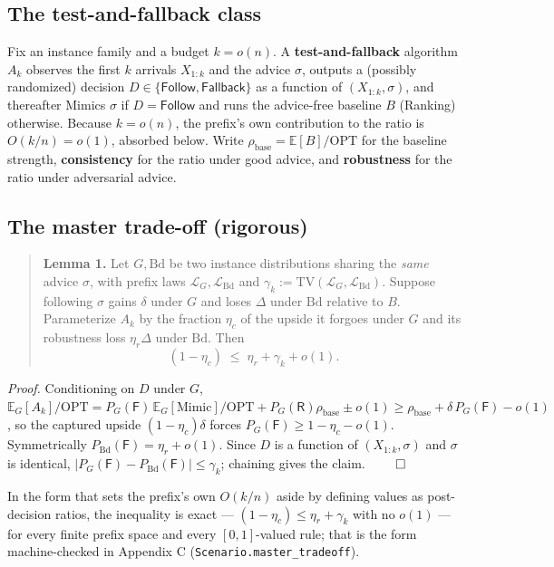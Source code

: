 \subsection{The test-and-fallback
class}

Fix an instance family and a budget \(k=o(n)\). A
\textbf{test-and-fallback} algorithm \(A_k\) observes the first \(k\)
arrivals \(X_{1:k}\) and the advice \(\sigma\), outputs a (possibly
randomized) decision \(D\in\{\mathsf{Follow},\mathsf{Fallback}\}\) as a
function of \((X_{1:k},\sigma)\), and thereafter Mimics \(\sigma\) if
\(D=\mathsf{Follow}\) and runs the advice-free baseline \(B\) (Ranking)
otherwise. Because \(k=o(n)\), the prefix's own contribution to the
ratio is \(O(k/n)=o(1)\), absorbed below. Write \(\rho_{\mathrm{base}} =
\mathbb E[B]/\mathrm{OPT}\) for the baseline strength,
\textbf{consistency} for the ratio under good advice, and
\textbf{robustness} for the ratio under adversarial advice.

\subsection{The master trade-off
(rigorous)}

\begin{quote}
\textbf{Lemma 1.} Let \(G,\mathrm{Bd}\) be two instance distributions
sharing the \emph{same} advice \(\sigma\), with prefix laws
\(\mathcal L_G,\mathcal L_{\mathrm{Bd}}\) and
\(\gamma_k:=\mathrm{TV}(\mathcal L_G,\mathcal L_{\mathrm{Bd}})\).
Suppose following \(\sigma\) gains \(\delta\) under \(G\) and loses
\(\Delta\) under \(\mathrm{Bd}\) relative to \(B\). Parameterize \(A_k\)
by the fraction \(\eta_c\) of the upside it forgoes under \(G\) and its
robustness loss \(\eta_r\Delta\) under \(\mathrm{Bd}\). Then
\[(1-\eta_c)\;\le\;\eta_r+\gamma_k+o(1).\]
\end{quote}

\emph{Proof.} Conditioning on \(D\) under \(G\),
\(\mathbb E_G[A_k]/\mathrm{OPT} = P_G(\mathsf F)\,
\mathbb E_G[\mathrm{Mimic}]/\mathrm{OPT} + P_G(\mathsf R)\rho_{\mathrm{base}} \pm o(1) \ge
\rho_{\mathrm{base}} + \delta\,P_G(\mathsf F)-o(1)\), so the captured
upside \((1-\eta_c)\delta\) forces \(P_G(\mathsf F)\ge 1-\eta_c-o(1)\).
Symmetrically \(P_{\mathrm{Bd}}(\mathsf F)=\eta_r
+o(1)\). Since \(D\) is a function of \((X_{1:k},\sigma)\) and
\(\sigma\) is identical,
\(|P_G(\mathsf F)-P_{\mathrm{Bd}}(\mathsf F)|\le\gamma_k\); chaining
gives the claim. \(\qed\)

In the form that sets the prefix's own \(O(k/n)\) aside by defining
values as post-decision ratios, the inequality is exact ---
\((1-\eta_c)\le\eta_r+\gamma_k\) with no \(o(1)\) --- for every finite
prefix space and every \([0,1]\)-valued rule; that is the form
machine-checked in Appendix C (\texttt{Scenario.master\_tradeoff}).

